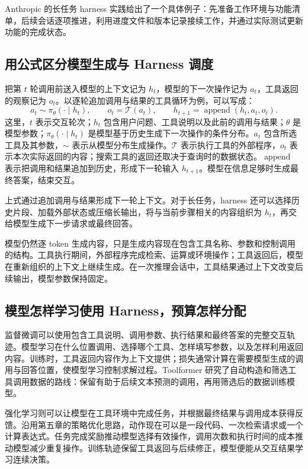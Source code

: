 Anthropic 的长任务 harness 实践给出了一个具体例子：先准备工作环境与功能清单，后续会话逐项推进，利用进度文件和版本记录接续工作，并通过实际测试更新功能的完成状态。

\subsection{用公式区分模型生成与 Harness 调度}

把第 $t$ 轮调用前送入模型的上下文记为 $h_t$，模型的下一次操作记为 $a_t$，工具返回的观察记为 $o_t$。以逐轮追加调用与结果的工具循环为例，可以写成：
\[
    a_t\sim\pi_\theta(\cdot\mid h_t),\qquad
    o_t=\mathcal T(a_t),\qquad
    h_{t+1}=\operatorname{append}(h_t,a_t,o_t).
\]
这里，$t$ 表示交互轮次；$h_t$ 包含用户问题、工具说明以及此前的调用与结果；$\theta$ 是模型参数；$\pi_\theta(\cdot\mid h_t)$ 是模型基于历史生成下一次操作的条件分布。$a_t$ 包含所选工具及其参数，$\sim$ 表示从模型分布生成操作。$\mathcal T$ 表示执行工具的外部程序，$o_t$ 表示本次实际返回的内容；搜索工具的返回还取决于查询时的数据状态。$\operatorname{append}$ 表示把调用和结果追加到历史，形成下一轮输入 $h_{t+1}$。模型在信息足够时生成最终答案，结束交互。

上式通过追加调用与结果形成下一轮上下文。对于长任务，harness 还可以选择历史片段、加载外部状态或压缩长输出，将与当前步骤相关的内容组织为 $h_t$，再交给模型生成下一步请求或最终回答。

模型仍然逐 token 生成内容，只是生成内容现在包含工具名称、参数和控制调用的结构。工具执行期间，外部程序完成检索、运算或环境操作；工具返回后，模型在重新组织的上下文上继续生成。在一次推理会话中，工具结果通过上下文改变后续输出，模型参数保持固定。

\subsection{模型怎样学习使用 Harness，预算怎样分配}

监督微调可以使用包含工具说明、调用参数、执行结果和最终答案的完整交互轨迹。模型学习在什么位置调用、选择哪个工具、怎样填写参数，以及怎样利用返回内容。训练时，工具返回内容作为上下文提供；损失通常计算在需要模型生成的调用与回答位置，使模型学习控制求解过程。Toolformer 研究了自动构造和筛选工具调用数据的路线：保留有助于后续文本预测的调用，再用筛选后的数据训练模型。

强化学习则可以让模型在工具环境中完成任务，并根据最终结果与调用成本获得反馈。沿用第五章的策略优化思路，动作现在可以是一段代码、一次检索请求或一个计算表达式。任务完成奖励推动模型选择有效操作，调用次数和执行时间的成本推动模型减少重复操作。训练轨迹保留工具返回与后续修正，模型便能从交互结果学习连续决策。

